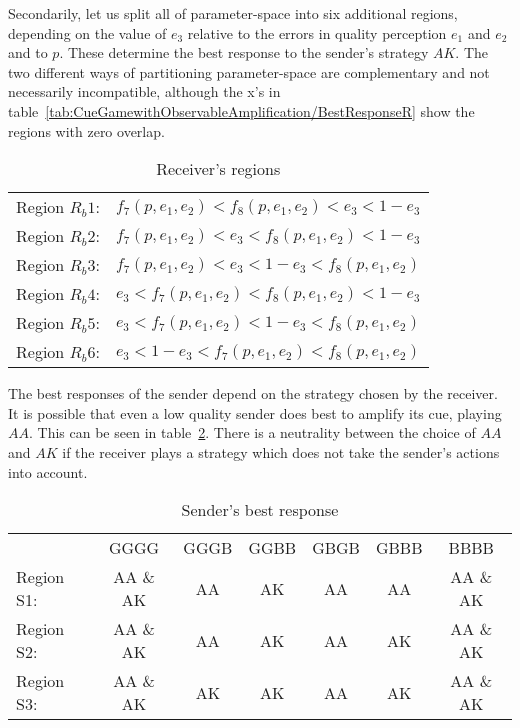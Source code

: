 \documentclass[a4paper,12pt]{article}
\numberwithin{equation}{section}
\renewcommand*{\arraystretch}{1.4}
\begin{document}
\vspace{2mm}

Secondarily, let us split all of parameter-space into six additional regions, depending on the value of $e_{3}$ relative to the errors in quality perception $e_{1}$ and $e_{2}$ and to $p$. These determine the best response to the sender's strategy $AK$. The two different ways of partitioning parameter-space are complementary and not necessarily incompatible, although the x's in table~\ref{tab:CueGamewithObservableAmplification/BestResponseR} show the regions with zero overlap.

\begin{table}[h]
\begin{center}
\begin{tabular}{lc}
Region $R_{b}1$: & $f_{7}(p,e_{1},e_{2})<f_{8}(p,e_{1},e_{2})<e_{3}<1-e_{3}$\\
Region $R_{b}2$: & $f_{7}(p,e_{1},e_{2})<e_{3}<f_{8}(p,e_{1},e_{2})<1-e_{3}$\\
Region $R_{b}3$: & $f_{7}(p,e_{1},e_{2})<e_{3}<1-e_{3}<f_{8}(p,e_{1},e_{2})$\\
Region $R_{b}4$: & $e_{3}<f_{7}(p,e_{1},e_{2})<f_{8}(p,e_{1},e_{2})<1-e_{3}$\\
Region $R_{b}5$: & $e_{3}<f_{7}(p,e_{1},e_{2})<1-e_{3}<f_{8}(p,e_{1},e_{2})$\\
Region $R_{b}6$: & $e_{3}<1-e_{3}<f_{7}(p,e_{1},e_{2})<f_{8}(p,e_{1},e_{2})$
\end{tabular}
\end{center}
\caption{Receiver's regions}
\label{tab:CueGamewithObservableAmplification/RegionsRb}
\end{table}

\vspace{2mm}

The best responses of the sender depend on the strategy chosen by the receiver. It is possible that even a low quality sender does best to amplify its cue, playing $AA$. This can be seen in table~\ref{tab:CueGamewithObservableAmplification/BestResponseS}. There is a neutrality between the choice of $AA$ and $AK$ if the receiver plays a strategy which does not take the sender's actions into account.

\begin{table}[h]
\renewcommand*{\arraystretch}{1.35}
\begin{center}
\begin{tabular}{lcccccc}
 & GGGG & GGGB & GGBB & GBGB & GBBB & BBBB\\
Region S1: & AA \& AK & AA & AK & AA & AA & AA \& AK\\
Region S2: & AA \& AK & AA & AK & AA & AK & AA \& AK\\
Region S3: & AA \& AK & AK & AK & AA & AK & AA \& AK
\end{tabular}
\end{center}
\caption{Sender's best response}
\label{tab:CueGamewithObservableAmplification/BestResponseS}
\end{table}
\end{document}
